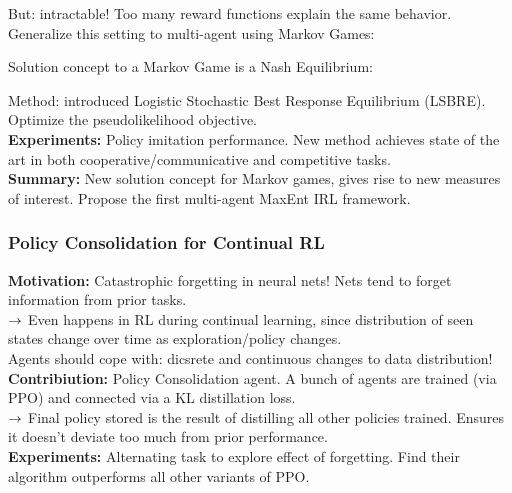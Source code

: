 But: intractable! Too many reward functions explain the same behavior. \\

Generalize this setting to multi-agent using Markov Games:


Solution concept to a Markov Game is a Nash Equilibrium:

Method: introduced Logistic Stochastic Best Response Equilibrium (LSBRE). Optimize the pseudolikelihood objective. \\

{\bf Experiments:} Policy imitation performance. New method achieves state of the art in both cooperative/communicative and competitive tasks. \\

{\bf Summary:} New solution concept for Markov games, gives rise to new measures of interest. Propose the first multi-agent MaxEnt IRL framework.

\spacerule

\subsubsection{Policy Consolidation for Continual RL}

{\bf Motivation:} Catastrophic forgetting in neural nets! Nets tend to forget information from prior tasks. \\

$\rightarrow$ Even happens in RL during continual learning, since distribution of seen states change over time as exploration/policy changes. \\

Agents should cope with: dicsrete and continuous changes to data distribution! \\

{\bf Contribiution:} Policy Consolidation agent. A bunch of agents are trained (via PPO) and connected via a KL distillation loss. \\

$\rightarrow$ Final policy stored is the result of distilling all other policies trained. Ensures it doesn't deviate too much from prior performance. \\

{\bf Experiments:} Alternating task to explore effect of forgetting. Find their algorithm outperforms all other variants of PPO. \\

